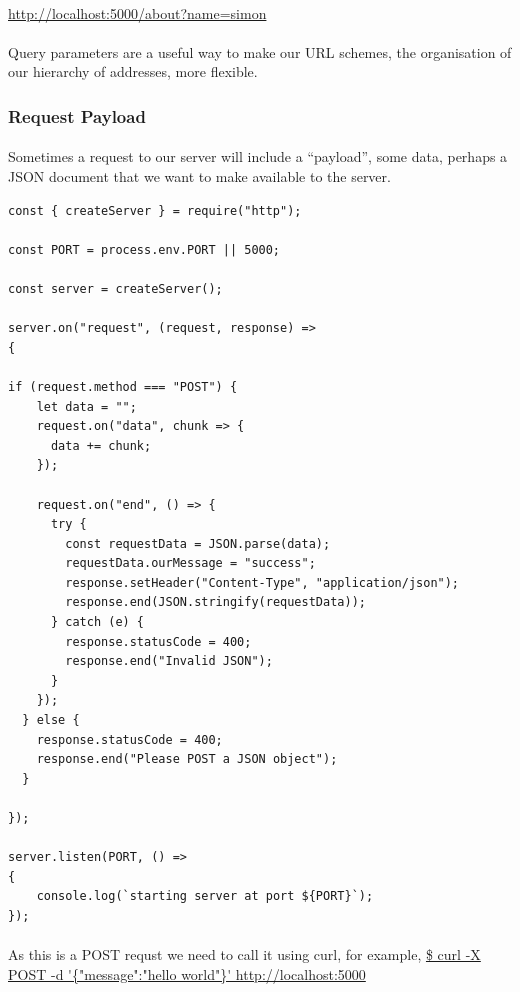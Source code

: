 \documentclass[10pt, a4paper, twosize]{article}
\begin{document}
\paragraph{} \url{http://localhost:5000/about?name=simon}


\paragraph{} Query parameters are a useful way to make our URL schemes, the organisation of our hierarchy of addresses, more flexible.

\subsubsection{Request Payload}
\paragraph{} Sometimes a request to our server will include a ``payload'', some data, perhaps a JSON document that we want to make available to the server.

\begin{lstlisting}
const { createServer } = require("http");

const PORT = process.env.PORT || 5000;

const server = createServer();

server.on("request", (request, response) => 
{

if (request.method === "POST") {
    let data = "";
    request.on("data", chunk => {
      data += chunk;
    });

    request.on("end", () => {
      try {
        const requestData = JSON.parse(data);
        requestData.ourMessage = "success";
        response.setHeader("Content-Type", "application/json");
        response.end(JSON.stringify(requestData));
      } catch (e) {
        response.statusCode = 400;
        response.end("Invalid JSON");
      }
    });
  } else {
    response.statusCode = 400;
    response.end("Please POST a JSON object");
  }

});

server.listen(PORT, () => 
{
    console.log(`starting server at port ${PORT}`);
});
\end{lstlisting}

\paragraph{} As this is a POST requst we need to call it using curl, for example, \url{$ curl -X POST -d '{"message":"hello world"}' http://localhost:5000}
\end{document}
